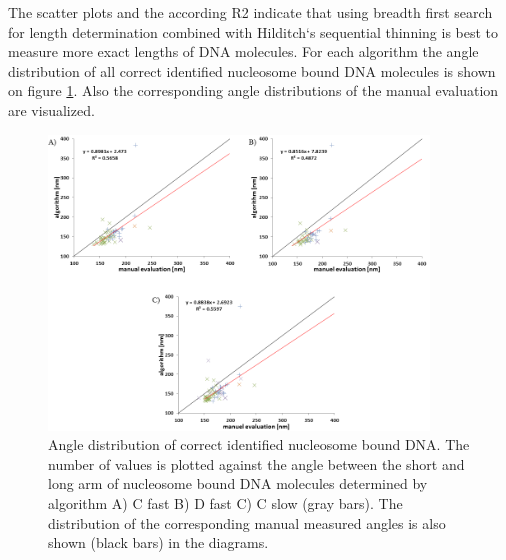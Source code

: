 \documentclass{article}
\begin{document}
The scatter plots and the according R2 indicate that using breadth first search for length determination combined with Hilditch‘s sequential thinning is best to measure more exact lengths of DNA molecules. For each algorithm the angle distribution of all correct identified nucleosome bound DNA molecules is shown on figure \ref{fig: validation6}. Also the corresponding angle distributions of the manual evaluation are visualized.
%
\begin{figure}[!htb]
	\begin{center}
		\includegraphics[width = 0.9\textwidth]{validation6}
	\end{center}
	\caption{Angle distribution of correct identified nucleosome bound DNA. The number of values is plotted against the angle between the short and long arm of nucleosome bound DNA molecules determined by algorithm A) C fast B) D fast C) C slow (gray bars). The distribution of the corresponding manual measured angles is also shown (black bars) in the diagrams.}
	\label{fig: validation6} %
\end{figure}
\end{document}
